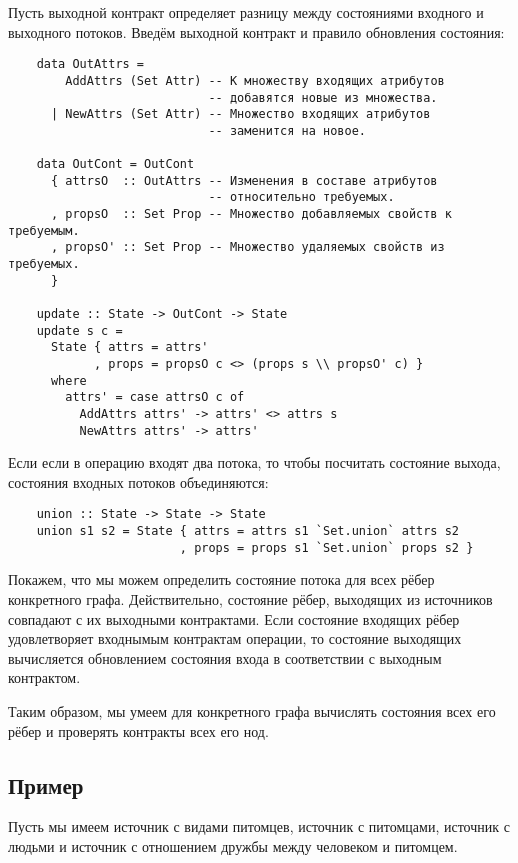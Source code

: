 Пусть выходной контракт определяет разницу между состояниями входного и выходного потоков. Введём выходной контракт и правило обновления состояния:

\begin{lstlisting}
    data OutAttrs =
        AddAttrs (Set Attr) -- К множеству входящих атрибутов
                            -- добавятся новые из множества.
      | NewAttrs (Set Attr) -- Множество входящих атрибутов
                            -- заменится на новое.

    data OutCont = OutCont
      { attrsO  :: OutAttrs -- Изменения в составе атрибутов
                            -- относительно требуемых.
      , propsO  :: Set Prop -- Множество добавляемых свойств к требуемым.
      , propsO' :: Set Prop -- Множество удаляемых свойств из требуемых.
      }

    update :: State -> OutCont -> State
    update s c =
      State { attrs = attrs'
            , props = propsO c <> (props s \\ propsO' c) }
      where
        attrs' = case attrsO c of
          AddAttrs attrs' -> attrs' <> attrs s
          NewAttrs attrs' -> attrs'
\end{lstlisting}

Если если в операцию входят два потока, то чтобы посчитать состояние выхода, состояния входных потоков объединяются:

\begin{lstlisting}
    union :: State -> State -> State
    union s1 s2 = State { attrs = attrs s1 `Set.union` attrs s2
                        , props = props s1 `Set.union` props s2 }
\end{lstlisting}

Покажем, что мы можем определить состояние потока для всех рёбер конкретного графа. Действительно, состояние рёбер, выходящих из источников совпадают с их выходными контрактами. Если состояние входящих рёбер удовлетворяет входнымым контрактам операции, то состояние выходящих вычисляется обновлением состояния входа в соответствии с выходным контрактом.

Таким образом, мы умеем для конкретного графа вычислять состояния всех его рёбер и проверять контракты всех его нод.

\subsection{Пример}

Пусть мы имеем источник с видами питомцев, источник с питомцами, источник с людьми и источник с отношением дружбы между человеком и питомцем.

